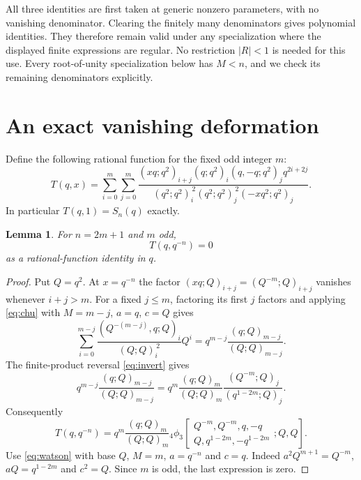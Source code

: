 \documentclass[11pt]{article}
\newtheorem{lemma}{Lemma}
\newcommand{\qp}[3]{(#1;#2)_{#3}}
\begin{document}
All three identities are first taken at generic nonzero parameters, with
no vanishing denominator. Clearing the finitely many denominators gives
polynomial identities. They therefore remain valid under any specialization
where the displayed finite expressions are regular. No restriction
$|R|<1$ is needed for this use. Every root-of-unity specialization below
has $M<n$, and we check its remaining denominators explicitly.

\section{An exact vanishing deformation}
Define the following rational function for the fixed odd integer $m$:
\begin{equation}\label{eq:T}
 T(q,x)=\sum_{i=0}^m\sum_{j=0}^m
 \frac{\qp{xq}{q^2}{i+j}\qp{q}{q^2}{i}\qp{q,-q}{q^2}{j}
 q^{2i+2j}}
 {\qp{q^2}{q^2}{i}^{\,2}\qp{q^2}{q^2}{j}^{\,2}
 \qp{-xq^2}{q^2}{j}}.
\end{equation}
In particular $T(q,1)=S_n(q)$ exactly.

\begin{lemma}\label{lem:zero}
For $n=2m+1$ and $m$ odd,
\begin{equation}\label{eq:exactzero}
 T(q,q^{-n})=0
\end{equation}
as a rational-function identity in $q$.
\end{lemma}
\begin{proof}
Put $Q=q^2$. At $x=q^{-n}$ the factor
$\qp{xq}{Q}{i+j}=\qp{Q^{-m}}{Q}{i+j}$ vanishes whenever $i+j>m$.
For a fixed $j\leq m$, factoring its first $j$ factors and applying
\eqref{eq:chu} with $M=m-j$, $a=q$, $c=Q$ gives
\[
 \sum_{i=0}^{m-j}\frac{\qp{Q^{-(m-j)},q}{Q}{i}}{\qp{Q}{Q}{i}^{\,2}}Q^i
 =q^{m-j}\frac{\qp{q}{Q}{m-j}}{\qp{Q}{Q}{m-j}}.
\]
The finite-product reversal \eqref{eq:invert} gives
\begin{equation}\label{eq:reverse}
 q^{m-j}\frac{\qp{q}{Q}{m-j}}{\qp{Q}{Q}{m-j}}
 =q^m\frac{\qp{q}{Q}{m}}{\qp{Q}{Q}{m}}
 \frac{\qp{Q^{-m}}{Q}{j}}{\qp{q^{1-2m}}{Q}{j}}.
\end{equation}
Consequently
\begin{equation}\label{eq:watsonuse}
 T(q,q^{-n})=q^m\frac{\qp{q}{Q}{m}}{\qp{Q}{Q}{m}}
 {}_4\phi_3\!\left[\begin{matrix}Q^{-m},Q^{-m},q,-q\\
 Q,q^{1-2m},-q^{1-2m}\end{matrix};Q,Q\right].
\end{equation}
Use \eqref{eq:watson} with base $Q$, $M=m$, $a=q^{-n}$ and $c=q$.
Indeed $a^2Q^{m+1}=Q^{-m}$, $aQ=q^{1-2m}$ and $c^2=Q$.
Since $m$ is odd, the last expression is zero.
\end{proof}
\end{document}
